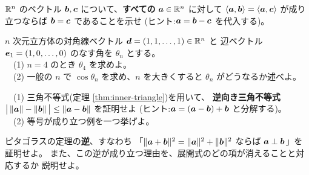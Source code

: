 \begin{mondai}[発展]\label{q:inner-ex9}
$\mathbb{R}^n$ のベクトル $\bm{b}, \bm{c}$ について、\textbf{すべての}
$\bm{a} \in \mathbb{R}^n$ に対して $\langle \bm{a}, \bm{b} \rangle
= \langle \bm{a}, \bm{c} \rangle$ が成り立つならば
$\bm{b} = \bm{c}$ であることを示せ
(ヒント:$\bm{a} = \bm{b} - \bm{c}$ を代入する)。
\end{mondai}

\begin{mondai}[発展]\label{q:inner-ex10}
$n$ 次元立方体の対角線ベクトル $\bm{d} = (1, 1, \dots, 1) \in \mathbb{R}^n$ と
辺ベクトル $\bm{e}_1 = (1, 0, \dots, 0)$ のなす角を $\theta_n$ とする。\\
　(1) $n = 4$ のとき $\theta_4$ を求めよ。\\
　(2) 一般の $n$ で $\cos\theta_n$ を求め、$n$ を大きくすると
$\theta_n$ がどうなるか述べよ。
\end{mondai}

\begin{mondai}[証明]\label{q:inner-ex11}
　(1) 三角不等式(定理 \ref{thm:inner-triangle})を用いて、
\textbf{逆向き三角不等式}
$\bigl|\,\|\bm{a}\| - \|\bm{b}\|\,\bigr| \le \|\bm{a} - \bm{b}\|$
を証明せよ
(ヒント:$\bm{a} = (\bm{a} - \bm{b}) + \bm{b}$ と分解する)。\\
　(2) 等号が成り立つ例を一つ挙げよ。
\end{mondai}

\begin{mondai}[証明]\label{q:inner-ex12}
ピタゴラスの定理の\textbf{逆}、すなわち
「$\|\bm{a} + \bm{b}\|^2 = \|\bm{a}\|^2 + \|\bm{b}\|^2$ ならば
$\bm{a} \perp \bm{b}$」を証明せよ。
また、この逆が成り立つ理由を、展開式のどの項が消えることと対応するか
説明せよ。
\end{mondai}

